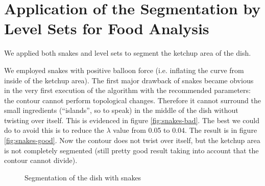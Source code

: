 \section{Application of the Segmentation by Level Sets for Food Analysis}

We applied both snakes and level sets to segment the ketchup area of the dish.

We employed snakes with positive balloon force (i.e. inflating the curve from inside of the ketchup area). The first major drawback of snakes became obvious in the very first execution of the algorithm with the recommended parameters: the contour cannot perform topological changes. Therefore it cannot surround the small ingredients (``islands'', so to speak) in the middle of the dish without twisting over itself.
This is evidenced in figure \ref{fig:snakes-bad}. The best we could do to avoid this is to reduce the $ \lambda $ value from 0.05 to 0.04. The result is in figure \ref{fig:snakes-good}. Now the contour does not twist over itself, but the ketchup area is not completely segmented (still pretty good result taking into account that the contour cannot divide).

\begin{figure}[!hbt]
\centering   
{}
\caption{Segmentation of the dish with snakes}
\label{fig:snakes-dish}
\end{figure}

